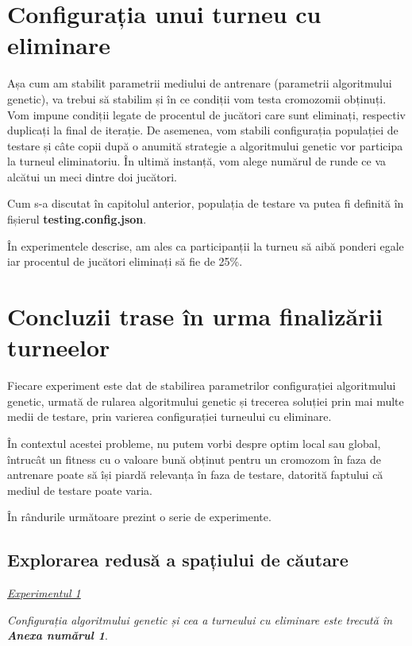 \section{Configurația unui turneu cu eliminare}

Așa cum am stabilit parametrii mediului de antrenare (parametrii algoritmului genetic), va trebui să stabilim și în ce condiții vom testa cromozomii obținuți. Vom impune condiții legate de procentul de jucători care sunt eliminați, respectiv duplicați la final de iterație. De asemenea, vom stabili configurația populației de testare și câte copii după o anumită strategie a algoritmului genetic vor participa la turneul eliminatoriu. În ultimă instanță, vom alege numărul de runde ce va alcătui un meci dintre doi jucători. 
 
Cum s-a discutat în capitolul anterior, populația de testare va putea fi definită în fișierul \textbf{testing.config.json}.

În experimentele descrise, am ales ca participanții la turneu să aibă ponderi egale iar procentul de  jucători eliminați să fie de 25\%. 

\section {Concluzii trase în urma finalizării turneelor}

Fiecare experiment este dat de stabilirea parametrilor configurației algoritmului genetic, urmată de rularea algoritmului genetic și trecerea soluției prin mai multe medii de testare, prin varierea configurației turneului cu eliminare.

În contextul acestei probleme, nu putem vorbi despre optim local sau global, întrucât un fitness cu o valoare bună obținut pentru un cromozom în faza de antrenare poate să își piardă relevanța în faza de testare, datorită faptului că mediul de testare poate varia. 

În rândurile următoare prezint o serie de experimente.  

\subsection {Explorarea redusă a spațiului de căutare} 

\begin{center}
	\underline{\textit{Experimentul 1}}
\end{center}

\textit{Configurația algoritmului genetic și cea a turneului cu eliminare este trecută în \textbf{Anexa numărul 1}}.\\

